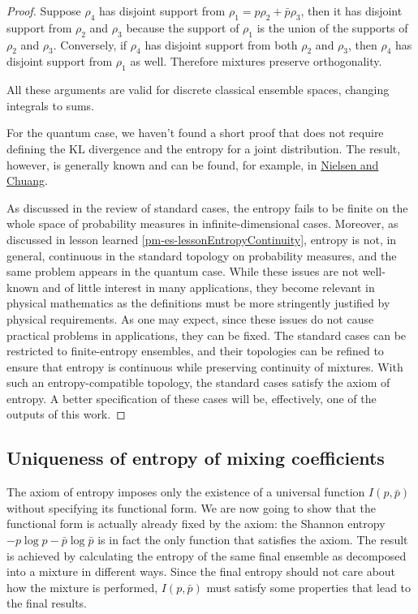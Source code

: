 \begin{mathSection}
\begin{proof}
		Suppose $\rho_4$ has disjoint support from $\rho_1 = p \rho_2 + \bar{p} \rho_3$, then it has disjoint support from $\rho_2$ and $\rho_3$ because the support of $\rho_1$ is the union of the supports of $\rho_2$ and $\rho_3$. Conversely, if $\rho_4$ has disjoint support from both $\rho_2$ and $\rho_3$, then $\rho_4$ has disjoint support from $\rho_1$ as well. Therefore mixtures preserve orthogonality.
		
		All these arguments are valid for discrete classical ensemble spaces, changing integrals to sums.
		
		For the quantum case, we haven't found a short proof that does not require defining the KL divergence and the entropy for a joint distribution. The result, however, is generally known and can be found, for example, in \href{https://www.cambridge.org/highereducation/books/quantum-computation-and-quantum-information/01E10196D0A682A6AEFFEA52D53BE9AE}{Nielsen and Chuang}.
		
		As discussed in the review of standard cases, the entropy fails to be finite on the whole space of probability measures in infinite-dimensional cases. Moreover, as discussed in lesson learned \ref{pm-es-lessonEntropyContinuity}, entropy is not, in general, continuous in the standard topology on probability measures, and the same problem appears in the quantum case. While these issues are not well-known and of little interest in many applications, they become relevant in physical mathematics as the definitions must be more stringently justified by physical requirements. As one may expect, since these issues do not cause practical problems in applications, they can be fixed. The standard cases can be restricted to finite-entropy ensembles, and their topologies can be refined to ensure that entropy is continuous while preserving continuity of mixtures. With such an entropy-compatible topology, the standard cases satisfy the axiom of entropy. A better specification of these cases will be, effectively, one of the outputs of this work.
	\end{proof}
\end{mathSection}


\subsection{Uniqueness of entropy of mixing coefficients}

The axiom of entropy imposes only the existence of a universal function $I(p,\bar{p})$ without specifying its functional form. We are now going to show that the functional form is actually already fixed by the axiom: the Shannon entropy $-p \log p - \bar{p} \log \bar{p}$ is in fact the only function that satisfies the axiom. The result is achieved by calculating the entropy of the same final ensemble as decomposed into a mixture in different ways. Since the final entropy should not care about how the mixture is performed, $I(p,\bar{p})$ must satisfy some properties that lead to the final results.

